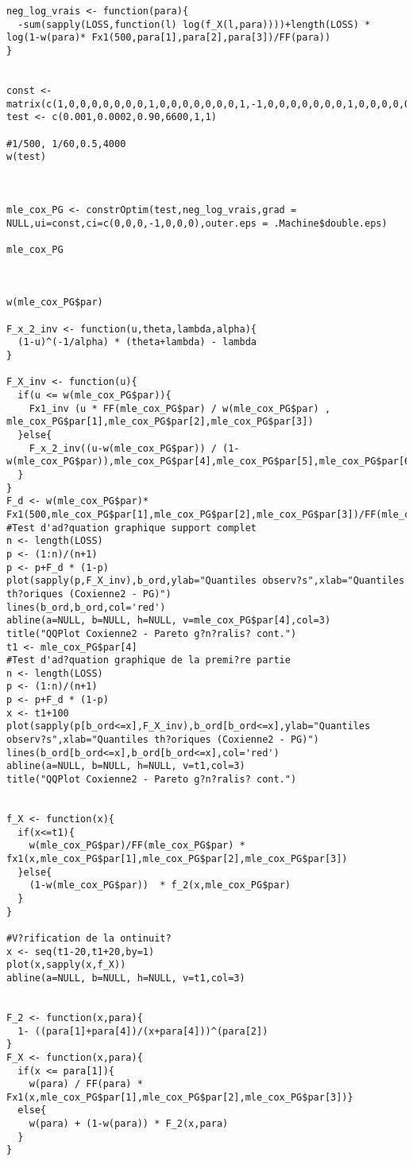 \begin{verbatim}
neg_log_vrais <- function(para){
  -sum(sapply(LOSS,function(l) log(f_X(l,para))))+length(LOSS) * log(1-w(para)* Fx1(500,para[1],para[2],para[3])/FF(para))
}


const <- matrix(c(1,0,0,0,0,0,0,0,1,0,0,0,0,0,0,0,1,-1,0,0,0,0,0,0,0,1,0,0,0,0,0,0,0,1,0,0,0,0,0,0,0,1),7,6)
test <- c(0.001,0.0002,0.90,6600,1,1)

#1/500, 1/60,0.5,4000
w(test)



mle_cox_PG <- constrOptim(test,neg_log_vrais,grad = NULL,ui=const,ci=c(0,0,0,-1,0,0,0),outer.eps = .Machine$double.eps)

mle_cox_PG



w(mle_cox_PG$par)

F_x_2_inv <- function(u,theta,lambda,alpha){
  (1-u)^(-1/alpha) * (theta+lambda) - lambda
}

F_X_inv <- function(u){
  if(u <= w(mle_cox_PG$par)){
    Fx1_inv (u * FF(mle_cox_PG$par) / w(mle_cox_PG$par) , mle_cox_PG$par[1],mle_cox_PG$par[2],mle_cox_PG$par[3])
  }else{
    F_x_2_inv((u-w(mle_cox_PG$par)) / (1-w(mle_cox_PG$par)),mle_cox_PG$par[4],mle_cox_PG$par[5],mle_cox_PG$par[6])
  }
}
F_d <- w(mle_cox_PG$par)* Fx1(500,mle_cox_PG$par[1],mle_cox_PG$par[2],mle_cox_PG$par[3])/FF(mle_cox_PG$par)
#Test d'ad?quation graphique support complet
n <- length(LOSS)
p <- (1:n)/(n+1)
p <- p+F_d * (1-p)
plot(sapply(p,F_X_inv),b_ord,ylab="Quantiles observ?s",xlab="Quantiles th?oriques (Coxienne2 - PG)")
lines(b_ord,b_ord,col='red')
abline(a=NULL, b=NULL, h=NULL, v=mle_cox_PG$par[4],col=3)
title("QQPlot Coxienne2 - Pareto g?n?ralis? cont.")
t1 <- mle_cox_PG$par[4]
#Test d'ad?quation graphique de la premi?re partie
n <- length(LOSS)
p <- (1:n)/(n+1)
p <- p+F_d * (1-p)
x <- t1+100
plot(sapply(p[b_ord<=x],F_X_inv),b_ord[b_ord<=x],ylab="Quantiles observ?s",xlab="Quantiles th?oriques (Coxienne2 - PG)")
lines(b_ord[b_ord<=x],b_ord[b_ord<=x],col='red')
abline(a=NULL, b=NULL, h=NULL, v=t1,col=3)
title("QQPlot Coxienne2 - Pareto g?n?ralis? cont.")


f_X <- function(x){
  if(x<=t1){
    w(mle_cox_PG$par)/FF(mle_cox_PG$par) * fx1(x,mle_cox_PG$par[1],mle_cox_PG$par[2],mle_cox_PG$par[3])
  }else{
    (1-w(mle_cox_PG$par))  * f_2(x,mle_cox_PG$par)
  }
}

#V?rification de la ontinuit?
x <- seq(t1-20,t1+20,by=1)
plot(x,sapply(x,f_X))
abline(a=NULL, b=NULL, h=NULL, v=t1,col=3)


F_2 <- function(x,para){
  1- ((para[1]+para[4])/(x+para[4]))^(para[2])
}
F_X <- function(x,para){
  if(x <= para[1]){
    w(para) / FF(para) * Fx1(x,mle_cox_PG$par[1],mle_cox_PG$par[2],mle_cox_PG$par[3])}
  else{
    w(para) + (1-w(para)) * F_2(x,para)
  }
}


\end{verbatim}
